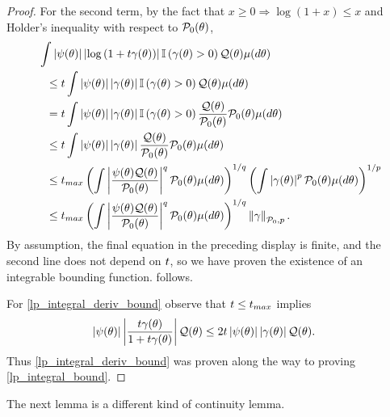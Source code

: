 \begin{lem}
\begin{proof}
For the second term, by the fact that $x \ge 0 \Rightarrow \log (1 + x) \le x$
and Holder's inequality with respect to $\mathcal{P}_{0}(\theta)$,
%
\begin{align*}
%
\MoveEqLeft
\int \abs{\psi(\theta)}
    \abs{\log\left(1 + \t \gamma(\theta)\right)}
    \ind{\gamma(\theta) > 0}
    \q(\theta)\mu(d\theta)
\\\le{}&
\t
\int \abs{\psi(\theta)}
    \abs{\gamma(\theta)}
    \ind{\gamma(\theta) > 0}
    \q(\theta)\mu(d\theta)
\\={}&
\t
\int \abs{\psi(\theta)}
    \abs{\gamma(\theta)}
    \ind{\gamma(\theta) > 0}
    \frac{\q(\theta)}{\pbase(\theta)} \pbase(\theta) \mu(d\theta)
\\\le{}&
\t
\int \abs{\psi(\theta)}
    \abs{\gamma(\theta)}
    \frac{\q(\theta)}{\pbase(\theta)} \pbase(\theta) \mu(d\theta)
\\\le{}&
\t_{max}
\left(
\int
    \abs{\frac{\psi(\theta)\q(\theta)}{\pbase(\theta)}}^q
    \pbase(\theta) \mu(d\theta)
\right)^{1/q}
\left(
\int\abs{\gamma(\theta)}^p \pbase(\theta) \mu(d\theta)
\right)^{1/p}
\\\le{}&
\t_{max}
\left(
\int
    \abs{\frac{\psi(\theta)\q(\theta)}{\pbase(\theta)}}^q
    \pbase(\theta) \mu(d\theta)
\right)^{1/q}
\norm{\gamma}_{\pbase,p}.
%
\end{align*}
%
By assumption, the final equation in the preceding display is finite, and the
second line does not depend on $t$, so we have proven the existence of an
integrable bounding function.   follows.

For \eqref{lp_integral_deriv_bound} observe that $t \le t_{max}$ implies
%
\begin{align*}
%
\abs{\psi(\theta)}
    \abs{\frac{\t \gamma(\theta)}{1 + \t \gamma(\theta)}} \q(\theta)
\le{}&
2 \t \abs{\psi(\theta)} \abs{\gamma(\theta)} \q(\theta).
%
\end{align*}
%
Thus \eqref{lp_integral_deriv_bound} was proven along the way to
proving \eqref{lp_integral_bound}.
%
\end{proof}
%
\end{lem}




The next lemma is a different kind of continuity lemma.


